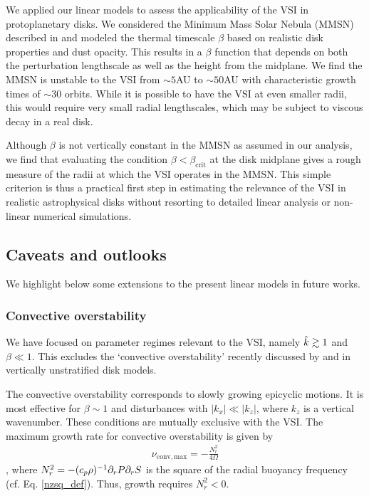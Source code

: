 We applied our linear models to assess the applicability of the VSI in
protoplanetary disks. We considered the Minimum Mass Solar Nebula 
(MMSN) described in \cite{chiang10} and   
modeled the thermal timescale $\beta$ based on realistic
disk properties and dust opacity. This results in a $\beta$ function that
depends on both the perturbation lengthscale as well as the height 
from the midplane. We find the MMSN is unstable to the VSI 
from $\sim 5$AU to $\sim50$AU with characteristic growth times of
$\sim 30$ orbits. While it is possible to have the VSI at even
smaller radii, this would require very small radial lengthscales, 
which may be subject to viscous decay in a real disk. 

Although $\beta$ is not vertically constant in the
MMSN as assumed in our analysis, we find that evaluating the condition
$\beta <\beta_\mathrm{crit}$ at the disk midplane gives a rough measure of the
radii at which the VSI operates in the MMSN. This simple criterion is
thus a practical first step in estimating the relevance of the VSI in
realistic astrophysical disks without resorting to detailed linear
analysis or non-linear numerical simulations.   

\subsection{Caveats and outlooks} 
We highlight below some extensions to the present  
linear models in future works.  

\subsubsection{Convective overstability}
We have focused on parameter regimes relevant to the VSI,
namely $\hat{k}\gtrsim 1$ and $\beta\ll 1$. This excludes the
`convective overstability' recently discussed by \cite{klahr14} and
\cite{lyra14} in vertically unstratified disk models. 

The convective overstability corresponds to slowly growing epicyclic motions.
It is most effective for $\beta\sim 1$ and disturbances with $|k_x|\ll |k_z|$, where
$k_z$ is a vertical wavenumber. These conditions are mutually exclusive with the VSI. 
The maximum growth rate for convective overstability is given by 
\begin{align}
  \nu_\mathrm{conv,max} = -\frac{N^2_r}{4\Omega}\label{max_conv_gen}
\end{align}
\citep{lyra14}, where $N_r^2 = -(c_p\rho)^{-1}\partial_rP\partial_rS$ is the
square of the radial buoyancy frequency
(cf. Eq. \ref{nzsq_def}). Thus, growth requires $N_r^2<0$.  

